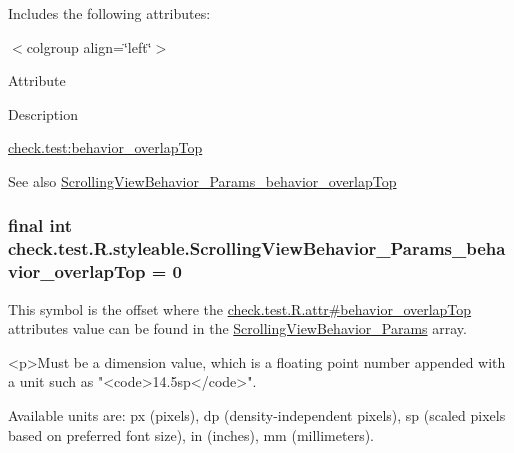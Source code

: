 Includes the following attributes\+:

\begin{TabularC}{0}
\hline
\end{TabularC}
$<$colgroup align=\char`\"{}left\char`\"{}$>$ 

Attribute

Description 

{\ttfamily \hyperlink{classcheck_1_1test_1_1_r_1_1styleable_a2b80a0f1eea41a224fac01a36d3063ab}{check.\+test\+:behavior\+\_\+overlap\+Top}}

\begin{DoxySeeAlso}{See also}
\hyperlink{classcheck_1_1test_1_1_r_1_1styleable_a2b80a0f1eea41a224fac01a36d3063ab}{Scrolling\+View\+Behavior\+\_\+\+Params\+\_\+behavior\+\_\+overlap\+Top} 
\end{DoxySeeAlso}
\hypertarget{classcheck_1_1test_1_1_r_1_1styleable_a2b80a0f1eea41a224fac01a36d3063ab}{}
\subsubsection[{Scrolling\+View\+Behavior\+\_\+\+Params\+\_\+behavior\+\_\+overlap\+Top}]{\setlength{\rightskip}{0pt plus 5cm}final int check.\+test.\+R.\+styleable.\+Scrolling\+View\+Behavior\+\_\+\+Params\+\_\+behavior\+\_\+overlap\+Top = 0\hspace{0.3cm}{\ttfamily [static]}}\label{classcheck_1_1test_1_1_r_1_1styleable_a2b80a0f1eea41a224fac01a36d3063ab}
This symbol is the offset where the \hyperlink{classcheck_1_1test_1_1_r_1_1attr_a9be1079997ebc31c25e478abff5ec982}{check.\+test.\+R.\+attr\#behavior\+\_\+overlap\+Top} attribute\textquotesingle{}s value can be found in the \hyperlink{classcheck_1_1test_1_1_r_1_1styleable_a9b4214227a61058f0ea9bce020f30cad}{Scrolling\+View\+Behavior\+\_\+\+Params} array.

\begin{DoxyVerb}      <p>Must be a dimension value, which is a floating point number appended with a unit such as "<code>14.5sp</code>".
\end{DoxyVerb}
 Available units are\+: px (pixels), dp (density-\/independent pixels), sp (scaled pixels based on preferred font size), in (inches), mm (millimeters). 

